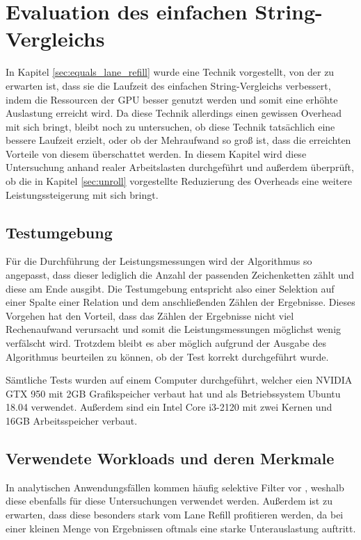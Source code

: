 \chapter{Evaluation des einfachen String-Vergleichs}
\label{sec:equals_evaluation}

In Kapitel \ref{sec:equals_lane_refill} wurde eine Technik vorgestellt, von der zu erwarten ist, dass sie die Laufzeit des einfachen String-Vergleichs verbessert, indem die Ressourcen der GPU besser genutzt werden und somit eine erhöhte Auslastung erreicht wird.
Da diese Technik allerdings einen gewissen Overhead mit sich bringt, bleibt noch zu untersuchen, ob diese Technik tatsächlich eine bessere Laufzeit erzielt, oder ob der Mehraufwand so groß ist, dass die erreichten Vorteile von diesem überschattet werden.
In diesem Kapitel wird diese Untersuchung anhand realer Arbeitslasten durchgeführt und außerdem überprüft, ob die in Kapitel \ref{sec:unroll} vorgestellte Reduzierung des Overheads eine weitere Leistungssteigerung mit sich bringt.

\section{Testumgebung}
\label{sec:equals_testumgebung}

Für die Durchführung der Leistungsmessungen wird der Algorithmus so angepasst, dass dieser lediglich die Anzahl der passenden Zeichenketten zählt und diese am Ende ausgibt.
Die Testumgebung entspricht also einer Selektion auf einer Spalte einer Relation und dem anschließenden Zählen der Ergebnisse.
Dieses Vorgehen hat den Vorteil, dass das Zählen der Ergebnisse nicht viel Rechenaufwand verursacht und somit die Leistungsmessungen möglichst wenig verfälscht wird.
Trotzdem bleibt es aber möglich aufgrund der Ausgabe des Algorithmus beurteilen zu können, ob der Test korrekt durchgeführt wurde.

Sämtliche Tests wurden auf einem Computer durchgeführt, welcher eien NVIDIA GTX 950 mit 2GB Grafikspeicher verbaut hat und als Betriebssystem Ubuntu 18.04 verwendet.
Außerdem sind ein Intel Core i3-2120 mit zwei Kernen und 16GB Arbeitsspeicher verbaut.

\section{Verwendete Workloads und deren Merkmale}
\label{sec:equals_evaluation_workloads}

In analytischen Anwendungsfällen kommen häufig selektive Filter vor \cite{Boncz2013}, weshalb diese ebenfalls für diese Untersuchungen verwendet werden.
Außerdem ist zu erwarten, dass diese besonders stark vom Lane Refill profitieren werden, da bei einer kleinen Menge von Ergebnissen oftmals eine starke Unterauslastung auftritt.

